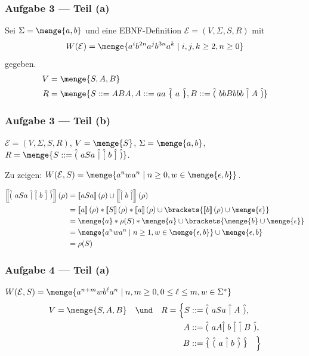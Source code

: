 \documentclass{beamer}
\newcommand{\wdh}[1]{\hat{\{} \ #1 \ \hat{\}}}
\newcommand{\opt}[2]{\hat{(} \ #1 \ \hat{|} \ #2 \ \hat{)}}
\newcommand{\byp}[1]{\hat{[} \ #1 \ \hat{]}}
\newcommand{\sem}[1]{\left\llbracket #1 \right\rrbracket}
\begin{document}
\begin{frame} \frametitle{Aufgabe 3 --- Teil (a)}
	Sei $\Sigma = \menge{a,b}$ und eine EBNF-Definition $\mathcal{E} = (V,\Sigma,S,R)$ mit 
	\begin{equation*}
		W(\mathcal{E}) = \menge{a^i b^{2n} a^j b^{3n} a^k \mid i,j,k \ge 2, n \ge 0} 
	\end{equation*}
	gegeben. \pause
	\begin{align*}
		V &= \menge{S,A,B} \\
		R &= \menge{S ::= ABA , A ::= aa \ \wdh{a}, B ::= \opt{bbBbbb}{A}}
	\end{align*}
\end{frame}

\begin{frame} \frametitle{Aufgabe 3 --- Teil (b)}
	$\mathcal{E} = (V,\Sigma,S,R)$, $V = \menge{S}$, $\Sigma = \menge{a,b}$, $R = \menge{S ::= \opt{aSa}{\byp{b}}}$. 
	
	Zu zeigen: $W(\mathcal{E},S) = \menge{a^n w a^n \mid n \ge 0, w \in \menge{\epsilon,b}}$.
	
	\pause 
	
	\begin{align*}
		\sem{\opt{aSa}{\byp{b}}}(\rho) 
		&= \sem{aSa}(\rho) \cup \sem{\byp{b}}(\rho) \\
		&= \sem{a}(\rho) * \sem{S}(\rho) * \sem{a}(\rho) \cup \brackets{\sem{b}(\rho) \cup \menge{\epsilon}} \\
		&= \menge{a} * \rho(S) * \menge{a} \cup \brackets{\menge{b} \cup \menge{\epsilon}} \\
		&= \menge{a^n w a^n \mid n \ge 1, w \in \menge{\epsilon, b}} \cup \menge{\epsilon,b} \\
		&= \rho(S)
	\end{align*}
\end{frame}

\begin{frame} \frametitle{Aufgabe 4 --- Teil (a)}
	$W(\mathcal{E},S) = \menge{a^{n+m} w b^\ell a^n \mid n,m \ge 0, 0 \le \ell \le m, w \in \Sigma^\ast}$
	\pause
	\begin{align*}
		V = \menge{S,A,B} \quad \und \quad  
		R = \Big\{ S &::= \opt{aSa}{A} ,\\
			A & ::= \opt{aA \byp{b}}{B}, \\
			B & ::= \wdh{\opt{a}{b}} \quad \Big\}
	\end{align*}
\end{frame}
\end{document}
